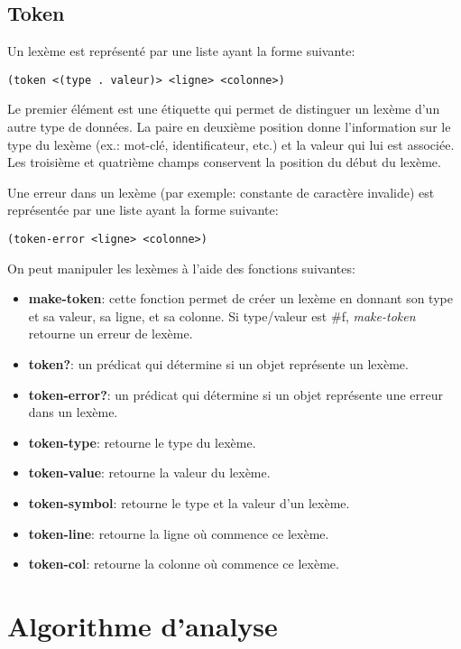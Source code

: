\documentclass[11pt]{report}
\begin{document}
\subsection{Token}

Un lexème est représenté par une liste ayant la forme suivante:

\begin{verbatim}
(token <(type . valeur)> <ligne> <colonne>)
\end{verbatim}

Le premier élément est une étiquette qui permet de distinguer un
lexème d'un autre type de données.  La paire en deuxième position
donne l'information sur le type du lexème (ex.: mot-clé,
identificateur, etc.) et la valeur qui lui est associée.  Les
troisième et quatrième champs conservent la position du début du
lexème.

Une erreur dans un lexème (par exemple: constante de caractère
invalide) est représentée par une liste ayant la forme suivante:

\begin{verbatim}
(token-error <ligne> <colonne>)
\end{verbatim}


On peut manipuler les lexèmes à l'aide des fonctions suivantes:

\begin{itemize}
\item {\bf make-token}: cette fonction permet de créer un lexème en
  donnant son type et sa valeur, sa ligne, et sa colonne.  Si
  type/valeur est \#f, \emph{make-token} retourne un erreur de lexème.
\item {\bf token?}: un prédicat qui détermine si un objet représente
  un lexème.
\item {\bf token-error?}: un prédicat qui détermine si un objet
  représente une erreur dans un lexème.
\item {\bf token-type}: retourne le type du lexème.
\item {\bf token-value}: retourne la valeur du lexème.
\item {\bf token-symbol}: retourne le type et la valeur d'un lexème.
\item {\bf token-line}: retourne la ligne où commence ce lexème.
\item {\bf token-col}: retourne la colonne où commence ce lexème.
\end{itemize}

\section{Algorithme d'analyse}
\end{document}
